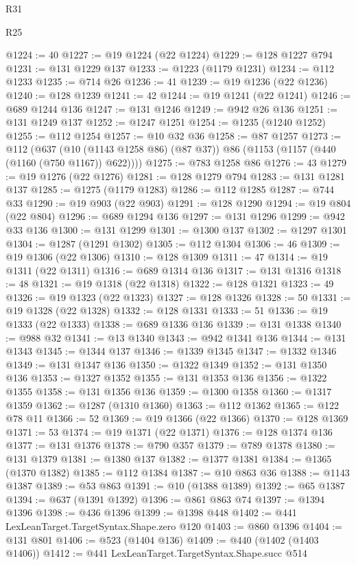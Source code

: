 \begin{lexlean}{R31}
\begin{lexlean}{R25}
\begin{coremodule}
{{{{{{{{{{{{{{{{{{{{{{{{{{{{{{{{{{{{{{{{{{{{{{{{{{{{{{{{{{{{{{{{{{{{{{{{{{{{{{{{{{{{{{{{{{{{{{{{{{{{{{{{{{{{{{{{{{{{{{{{{{{{{{{{{{{{{{{{{{{{{{{{{{{{{{{{{{{{{{{{{{{{{{{{{{{{{{{{{{{{{{{{{{{{{{{{{{{{{{{@1224 := 40
@1227 := @19 @1224 (@22 @1224)
@1229 := @128 @1227 @794
@1231 := @131 @1229 @137
@1233 := @1223 (@1179 @1231)
@1234 := @112 @1233
@1235 := @714 @26
@1236 := 41
@1239 := @19 @1236 (@22 @1236)
@1240 := @128 @1239
@1241 := 42
@1244 := @19 @1241 (@22 @1241)
@1246 := @689 @1244 @136
@1247 := @131 @1246
@1249 := @942 @26 @136
@1251 := @131 @1249 @137
@1252 := @1247 @1251
@1254 := @1235 (@1240 @1252)
@1255 := @112 @1254
@1257 := @10 @32 @36
@1258 := @87 @1257
@1273 := @112
    (@637 (@10 (@1143 @1258 @86) (@87 @37)) @86 (@1153 (@1157 (@440 (@1160 (@750 @1167)) @622))))
@1275 := @783 @1258 @86
@1276 := 43
@1279 := @19 @1276 (@22 @1276)
@1281 := @128 @1279 @794
@1283 := @131 @1281 @137
@1285 := @1275 (@1179 @1283)
@1286 := @112 @1285
@1287 := @744 @33
@1290 := @19 @903 (@22 @903)
@1291 := @128 @1290
@1294 := @19 @804 (@22 @804)
@1296 := @689 @1294 @136
@1297 := @131 @1296
@1299 := @942 @33 @136
@1300 := @131 @1299
@1301 := @1300 @137
@1302 := @1297 @1301
@1304 := @1287 (@1291 @1302)
@1305 := @112 @1304
@1306 := 46
@1309 := @19 @1306 (@22 @1306)
@1310 := @128 @1309
@1311 := 47
@1314 := @19 @1311 (@22 @1311)
@1316 := @689 @1314 @136
@1317 := @131 @1316
@1318 := 48
@1321 := @19 @1318 (@22 @1318)
@1322 := @128 @1321
@1323 := 49
@1326 := @19 @1323 (@22 @1323)
@1327 := @128 @1326
@1328 := 50
@1331 := @19 @1328 (@22 @1328)
@1332 := @128 @1331
@1333 := 51
@1336 := @19 @1333 (@22 @1333)
@1338 := @689 @1336 @136
@1339 := @131 @1338
@1340 := @988 @32
@1341 := @13 @1340
@1343 := @942 @1341 @136
@1344 := @131 @1343
@1345 := @1344 @137
@1346 := @1339 @1345
@1347 := @1332 @1346
@1349 := @131 @1347 @136
@1350 := @1322 @1349
@1352 := @131 @1350 @136
@1353 := @1327 @1352
@1355 := @131 @1353 @136
@1356 := @1322 @1355
@1358 := @131 @1356 @136
@1359 := @1300 @1358
@1360 := @1317 @1359
@1362 := @1287 (@1310 @1360)
@1363 := @112 @1362
@1365 := @122 @78 @11
@1366 := 52
@1369 := @19 @1366 (@22 @1366)
@1370 := @128 @1369
@1371 := 53
@1374 := @19 @1371 (@22 @1371)
@1376 := @128 @1374 @136
@1377 := @131 @1376
@1378 := @790 @357
@1379 := @789 @1378
@1380 := @131 @1379
@1381 := @1380 @137
@1382 := @1377 @1381
@1384 := @1365 (@1370 @1382)
@1385 := @112 @1384
@1387 := @10 @863 @36
@1388 := @1143 @1387
@1389 := @53 @863
@1391 := @10 (@1388 @1389)
@1392 := @65 @1387
@1394 := @637 (@1391 @1392)
@1396 := @861 @863 @74
@1397 := @1394 @1396
@1398 := @436 @1396
@1399 := @1398 @448
@1402 := @441 LexLeanTarget.TargetSyntax.Shape.zero @120
@1403 := @860 @1396
@1404 := @131 @801
@1406 := @523 (@1404 @136)
@1409 := @440 (@1402 (@1403 @1406))
@1412 := @441 LexLeanTarget.TargetSyntax.Shape.succ @514
}}}}}}}}}}}}}}}}}}}}}}}}}}}}}}}}}}}}}}}}}}}}}}}}}}}}}}}}}}}}}}}}}}}}}}}}}}}}}}}}}}}}}}}}}}}}}}}}}}}}}}}}}}}}}}}}}}}}}}}}}}}}}}}}}}}}}}}}}}}}}}}}}}}}}}}}}}}}}}}}}}}}}}}}}}}}}}}}}}}}}}}}}}}}}}}}}}}}}}}
\end{coremodule}
\end{lexlean}
\end{lexlean}
